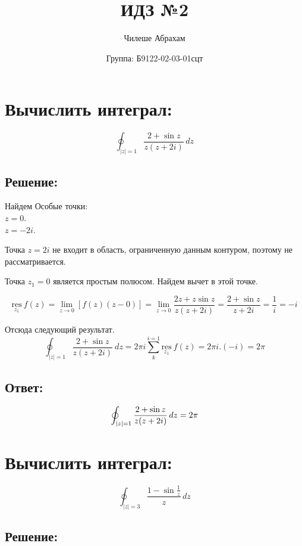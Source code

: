 \documentclass{article}
\title{\vspace{-1cm}
ИДЗ №2}
\author{Чилеше Абрахам}
\date{Группа: Б9122-02-03-01сцт}
\begin{document}
	\maketitle

	\section{Вычислить интеграл:}
	\[
		\oint_{|z| = 1}\frac{2 + \sin{z}}{z(z + 2i)}\, dz
	\]

	\subsection{Решение:}
	Найдем Особые точки:\\ $z = 0$.\\ $z = -2i$.\\

	\raggedright Точка $z = 2i$ не входит в область, ограниченную данным контуром,
	поэтому не рассматривается.
	\newline
	\raggedright Точка $z_{1} = 0$ является простым полюсом. Найдем вычет в этой
	точке.

	\[
		\underset{z_1}{\text{res}}\ f(z) = \lim\limits_{z\rightarrow 0}\left[f(z) (z
		- 0) \right] = \lim\limits_{z\rightarrow 0}\frac{2z + z\sin{z}}{z(z + 2i)}= \frac{2
		+ \sin{z}}{z + 2i}= \frac{1}{i}= -i
	\]

	\raggedright Отсюда следующий результат.
	\newline
	\[
		\oint_{|z| = 1}\frac{2 + \sin{z}}{z(z + 2i)}\ dz = 2\pi i \sum_{k}^{i=1}\underset
		{z_1}{\text{res}}\ f(z) = 2\pi i.(-i) = 2\pi
	\]

	\subsection{Ответ:}
	\[
		\raggedright{\oint_{|z| = 1} \frac{2 + \sin{z}}{z(z + 2i)}\, dz = 2\pi}
	\]

	\vspace{1.5cm}

	\section{Вычислить интеграл: }
	\[
		\oint_{|z| = 3}\frac{1 - \sin{\frac{1}{z}}}{z}\, dz
	\]

	\subsection{Решение:}
\end{document}
